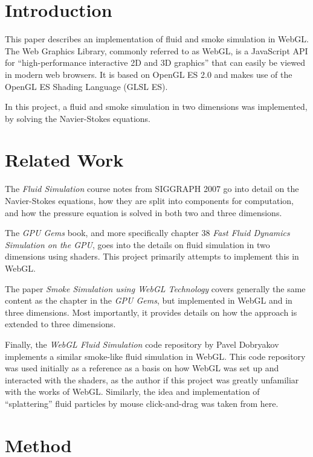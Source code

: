 \newcommand{\dt}{\Delta t}

\section{Introduction}

This paper describes an implementation of fluid and smoke simulation in WebGL.
The Web Graphics Library, commonly referred to as WebGL, is a JavaScript API
for ``high-performance interactive 2D and 3D graphics'' \cite{webgl} that can easily be viewed 
in modern web browsers. 
It is based on OpenGL ES 2.0 and makes use of the OpenGL ES Shading Language (GLSL ES).

In this project, a fluid and smoke simulation in two dimensions was implemented,
by solving the Navier-Stokes equations.

\section{Related Work}

The \textit{Fluid Simulation} course notes from SIGGRAPH 2007 go into detail on the
Navier-Stokes equations, 
how they are split into components for computation,
and how the pressure equation is solved in both two and three dimensions. \cite{fluid}

The \textit{GPU Gems} book, and more specifically chapter 38 \textit{Fast Fluid Dynamics Simulation on the GPU},
goes into the details on fluid simulation in two dimensions using shaders.
This project primarily attempts to implement this in WebGL. \cite{nvidia}

The paper \textit{Smoke Simulation using WebGL Technology} covers generally the same content
as the chapter in the \textit{GPU Gems}, but implemented in WebGL and in three dimensions.
Most importantly, it provides details on how the approach is extended to three dimensions.
\cite{smokesim}

Finally, the \textit{WebGL Fluid Simulation} code repository by Pavel Dobryakov implements a similar 
smoke-like fluid simulation in WebGL.
This code repository was used initially as a reference as a basis on how WebGL was set up 
and interacted with the shaders, as the author if this project was greatly unfamiliar with the works of WebGL.
Similarly, the idea and implementation of ``splattering'' fluid particles by mouse click-and-drag
was taken from here.
\cite{webglsim}

\section{Method}

